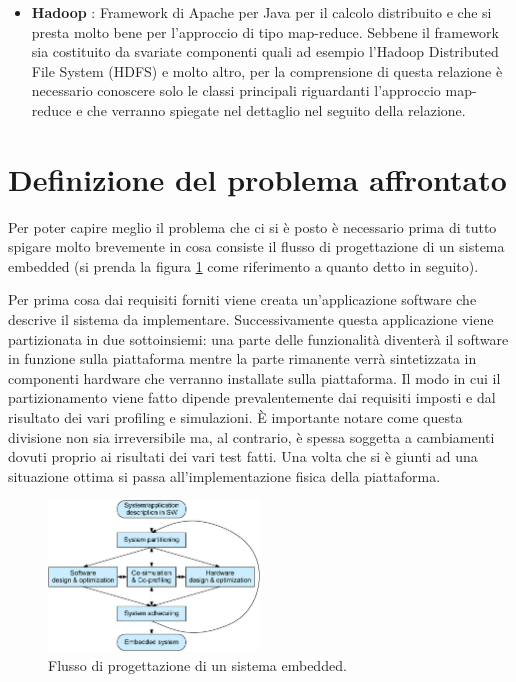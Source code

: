\documentclass[]{IEEEtran}
\begin{document}
\begin{itemize}
	\item \textbf{Hadoop} \cite{HADOOP}: Framework di Apache per Java per il calcolo distribuito e che si presta molto bene per l'approccio di tipo map-reduce. Sebbene il framework sia costituito da svariate componenti quali ad esempio l'Hadoop Distributed File System (HDFS) e molto altro, per la comprensione di questa relazione è necessario conoscere solo le classi principali riguardanti l'approccio map-reduce e che verranno spiegate nel dettaglio nel seguito della relazione.
\end{itemize}

\section{Definizione del problema affrontato}
Per poter capire meglio il problema che ci si è posto è necessario prima di tutto spigare molto brevemente in cosa consiste il flusso di progettazione di un sistema embedded (si prenda la figura \ref{pse} come riferimento a quanto detto in seguito).

Per prima cosa  dai requisiti forniti viene creata un'applicazione software che descrive il sistema da implementare. Successivamente questa applicazione viene partizionata in due sottoinsiemi: una parte delle funzionalità diventerà il software in funzione sulla piattaforma mentre la parte rimanente verrà sintetizzata in componenti hardware che verranno installate sulla piattaforma. Il modo in cui il partizionamento viene fatto dipende prevalentemente dai requisiti imposti e dal risultato dei vari profiling e simulazioni. È importante notare come questa divisione non sia irreversibile ma, al contrario, è spessa soggetta a cambiamenti dovuti proprio ai risultati dei vari test fatti. Una volta che si è giunti ad una situazione ottima si passa all'implementazione fisica della piattaforma.
\begin{figure}[htp]
	\centering
	\includegraphics[width=0.5\textwidth]{images/embedded_sys_df.png}
	\caption{Flusso di progettazione di un sistema embedded.}
	\label{pse}
\end{figure}
\end{document}
